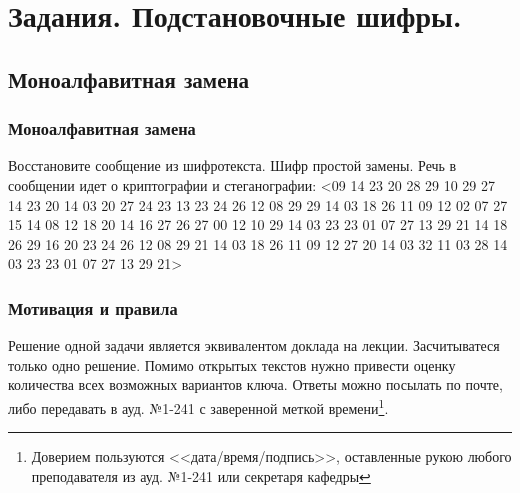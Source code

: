 \section{Задания. Подстановочные шифры.}


\subsection{Моноалфавитная замена}


\begin{frame}
    \frametitle{Моноалфавитная замена}

    Восстановите сообщение из шифротекста. Шифр простой замены. Речь в сообщении идет о криптографии и стеганографии: <09 14 23 20 28 29 10 29 27 14 23 20 14 03 20 27 24 23 13 23 24 26 12 08 29 29 14 03 18 26 11 09 12 02 07 27 15 14 08 12 18 20 14 16 27 26 27 00 12 10 29 14 03 23 23 01 07 27 13 29 21 14 18 26 29 16 20 23 24 26 12 08 29 21 14 03 18 26 11 09 12 27 20 14 03 32 11 03 28 14 03 23 23 01 07 27 13 29 21>
\end{frame}


\appendix %


\begin{frame}
    \frametitle{Мотивация и правила}
    
    Решение одной задачи является эквивалентом доклада на лекции. Засчитыватеся только \alert{одно} решение. Помимо открытых текстов \alert{нужно} привести оценку количества всех возможных вариантов ключа. Ответы можно посылать по почте, либо передавать в ауд. №1-241 с заверенной меткой времени\footnote{Доверием пользуются <<\alert{дата/время/подпись}>>, оставленные рукою любого преподавателя из ауд. №1-241 или секретаря кафедры}.
\end{frame}


